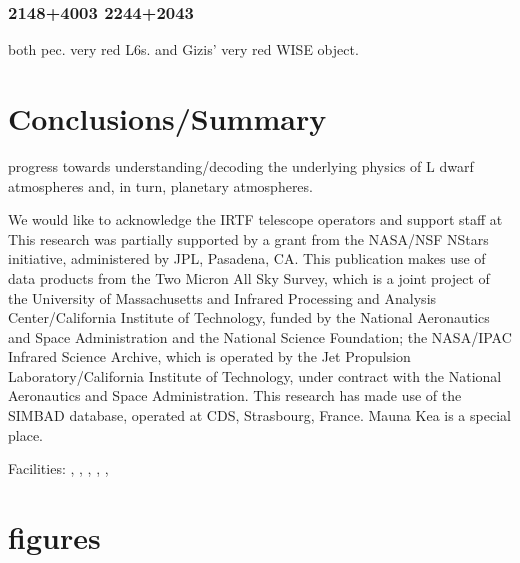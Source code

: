 \documentclass[12pt,preprint]{aastex}
\begin{document}
\subsubsection{2148+4003 2244+2043}
both pec. very red L6s. and Gizis' very red WISE object.
                                     
\section{Conclusions/Summary}
progress towards understanding/decoding the underlying physics of L dwarf atmospheres and, in turn, planetary atmospheres.

\acknowledgments
We would like to acknowledge the IRTF telescope operators
and support staff at 
This research was partially supported by a grant from the NASA/NSF
NStars initiative, administered by JPL, Pasadena, CA.  This publication makes use of data products from the Two Micron All Sky Survey, which is a joint project of the University of Massachusetts and Infrared Processing and Analysis
Center/California Institute of Technology, funded by the National Aeronautics and Space Administration and the National Science Foundation; the NASA/IPAC Infrared Science Archive, which is operated by the Jet Propulsion Laboratory/California Institute of Technology, under contract with the National Aeronautics and Space Administration.  This research has made use of the SIMBAD database, operated at CDS, Strasbourg, France.
Mauna Kea is a special place.

Facilities: 
, 
,
, 
,
, 
                                     


\clearpage 


\section{figures}
\end{document}
